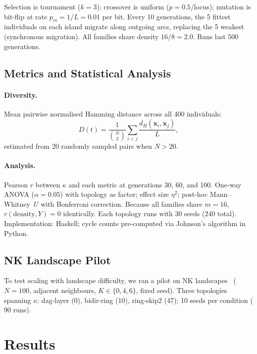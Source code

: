 \documentclass{llncs}
\begin{document}
Selection is tournament ($k = 3$); crossover is uniform ($p = 0.5$/locus);
mutation is bit-flip at rate $p_m = 1/L = 0.01$ per bit. Every 10 generations,
the 5 fittest individuals on each island migrate along outgoing arcs, replacing
the 5 weakest (synchronous migration). All families share density
$16/8 = 2.0$. Runs last 500 generations.

\subsection{Metrics and Statistical Analysis}

\paragraph{Diversity.} Mean pairwise normalised Hamming distance across all 400
individuals:
\[
  D(t) = \frac{1}{\binom{N}{2}} \sum_{i < j}
    \frac{d_H(\mathbf{x}_i, \mathbf{x}_j)}{L},
\]
estimated from 20 randomly sampled pairs when $N > 20$.

\paragraph{Analysis.} Pearson $r$ between $\kappa$ and each metric at
generations 30, 60, and 100. One-way ANOVA ($\alpha = 0.05$) with topology as
factor; effect size $\eta^2$; post-hoc Mann--Whitney~$U$ with Bonferroni
correction. Because all families share $m = 16$, $r(\text{density}, Y) = 0$
identically. Each topology runs with 30 seeds ($240$ total). Implementation:
Haskell; cycle counts pre-computed via Johnson's algorithm in Python.

\subsection{NK Landscape Pilot}

To test scaling with landscape difficulty, we ran a pilot on NK
landscapes~\cite{kauffman1993origins} ($N = 100$, adjacent neighbours,
$K \in \{0, 4, 6\}$, fixed seed). Three topologies spanning $\kappa$:
dag-layer (0), bidir-ring (10), ring-skip2 (47); 10 seeds per condition
($90$ runs).

\section{Results}
\label{sec:results}
\end{document}
